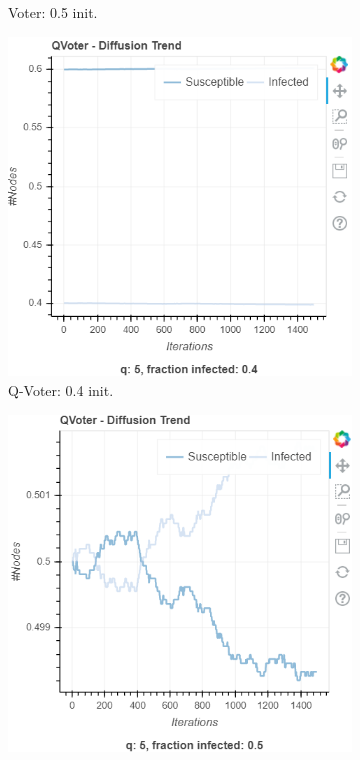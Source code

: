 \documentclass[sigchi]{acmart}
\begin{document}
\begin{figure}[ht]
\begin{subfigure}{.20\textwidth}
  \caption{Voter: 0.5 init.}
  \label{fig:sub-second}
\end{subfigure}
\hfill
\begin{subfigure}{.20\textwidth}
  \centering
  \includegraphics[width=\linewidth]{report/img/qvoter1.png} 
  \caption{Q-Voter: 0.4 init.}
  \label{fig:sub-third}
\end{subfigure}
\hfill
\begin{subfigure}{.20\textwidth}
  \centering
  \includegraphics[width=\linewidth]{report/img/qvoter2.png} 

\end{subfigure}
\end{figure}
\end{document}
